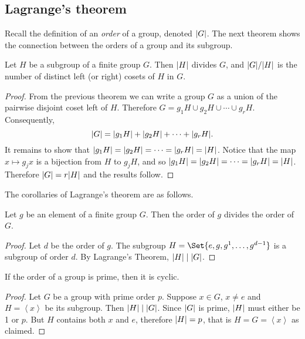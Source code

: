 \documentclass[main.tex]{subfiles}
\begin{document}
			\subsection{Lagrange’s theorem}
			Recall the definition of an \textit{order} of a group, denoted $\lvert G\rvert$. The next theorem shows the connection between the orders of a group and its subgroup.
				\begin{theorem} 
					Let $H$ be a subgroup of a finite group $G$. Then $\lvert H\rvert$ divides $G$, and $\lvert G\rvert/\lvert H\rvert$ is the number of distinct left (or right) cosets of $H$ in $G$.
				\end{theorem}
				\begin{proof}
					From the previous theorem we can write a group $G$ as a union of the pairwise disjoint coset left of $H$. Therefore $G = g_1H \cup g_2 H \cup \cdots \cup g_r H$. Consequently,
					\begin{equation*}
						\lvert G\rvert = \lvert g_1 H\rvert + \lvert g_2 H\rvert + \cdots + \lvert g_r H\rvert.
					\end{equation*}
					It remains to show that $\lvert g_1 H\rvert = \lvert g_2 H\rvert = \cdots = \lvert g_r H\rvert = \lvert H\rvert$. Notice that the map $x \mapsto g_j x$ is a bijection from $H$ to $g_j H$, and so $\lvert g_1 H\rvert = \lvert g_2 H\rvert = \cdots = \lvert g_r H\rvert = \lvert H\rvert$. Therefore $\lvert G\rvert = r\lvert H\rvert$ and the results follow.
				\end{proof}
			
			The corollaries of Lagrange's theorem are as follows.
			\begin{corollary}
					Let $g$ be an element of a finite group $G$. Then the order of $g$ divides the order of $G$.
			\end{corollary}
			\begin{proof}
				Let $d$ be the order of $g$. The subgroup $H = \Set{e, g, g^1, \ldots, g^{d-1}}$ is a subgroup of order $d$. By Lagrange's Theorem, $\lvert H\rvert \mid \lvert G\rvert$.
			\end{proof}
		
			\begin{corollary}
				If the order of a group is prime, then it is cyclic.
			\end{corollary}
				\begin{proof}
					Let $G$ be a group with prime order $p$. Suppose $x \in G$, $x \neq e$ and $H = \left\langle x \right\rangle $ be its subgroup. Then $\lvert H\rvert \mid \lvert G\rvert$. Since $\lvert G\rvert$ is prime, $\lvert H\rvert$ must either be 1 or $p$. But $H$ contains both $x$ and $e$, therefore $\lvert H\rvert = p$, that is $H = G = \left\langle x \right\rangle $ as claimed.
				\end{proof}
			
\end{document}
